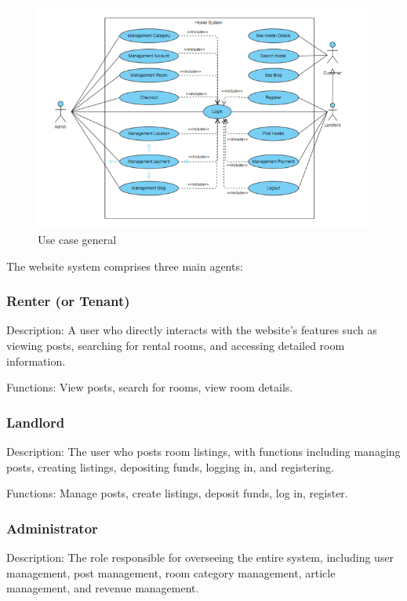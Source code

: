 \documentclass[../Main.tex]{subfiles}
\begin{document}
\begin{figure}[H]
    \centering
    \includegraphics[width=\textwidth]{Figure/Picture8.png}
    \caption{Use case general}
    \label{fig:usecase}
\end{figure}

The website system comprises three main agents:
\subsubsection{Renter (or Tenant)}

Description: A user who directly interacts with the website's features such as viewing posts, searching for rental rooms, and accessing detailed room information.

Functions: View posts, search for rooms, view room details.

\subsubsection{Landlord}
Description: The user who posts room listings, with functions including managing posts, creating listings, depositing funds, logging in, and registering.

Functions: Manage posts, create listings, deposit funds, log in, register.

\subsubsection{Administrator}

Description: The role responsible for overseeing the entire system, including user management, post management, room category management, article management, and revenue management.
\end{document}
